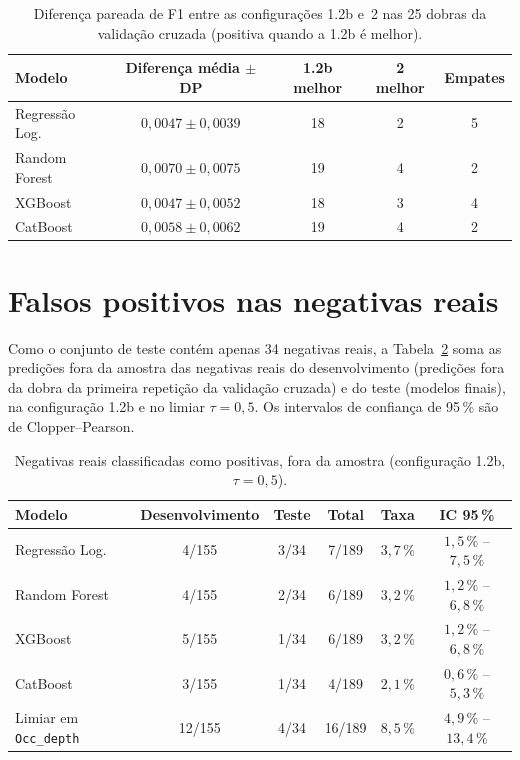 \begin{table}[htbp]
\centering
\caption{Diferença pareada de F1 entre as configurações 1.2b e~2 nas 25 dobras da validação cruzada (positiva quando a 1.2b é melhor).}
\label{tab:diferenca_pareada}
\footnotesize
\begin{tabular}{lcccc}
\hline
\textbf{Modelo} & \textbf{Diferença média $\pm$ DP} & \textbf{1.2b melhor} & \textbf{2 melhor} & \textbf{Empates} \\
\hline
Regressão Log. & $0{,}0047 \pm 0{,}0039$ & 18 & 2 & 5 \\
Random Forest & $0{,}0070 \pm 0{,}0075$ & 19 & 4 & 2 \\
XGBoost & $0{,}0047 \pm 0{,}0052$ & 18 & 3 & 4 \\
CatBoost & $0{,}0058 \pm 0{,}0062$ & 19 & 4 & 2 \\
\hline
\end{tabular}
\end{table}

\section{Falsos positivos nas negativas reais}
\label{sec:fp_reais_agregado}

Como o conjunto de teste contém apenas 34 negativas reais, a Tabela~\ref{tab:fp_reais_agregado} soma as predições fora da amostra das negativas reais do desenvolvimento (predições fora da dobra da primeira repetição da validação cruzada) e do teste (modelos finais), na configuração 1.2b e no limiar $\tau = 0{,}5$. Os intervalos de confiança de 95\,\% são de Clopper--Pearson.

\begin{table}[htbp]
\centering
\caption{Negativas reais classificadas como positivas, fora da amostra (configuração 1.2b, $\tau = 0{,}5$).}
\label{tab:fp_reais_agregado}
\footnotesize
\begin{tabular}{lccccc}
\hline
\textbf{Modelo} & \textbf{Desenvolvimento} & \textbf{Teste} & \textbf{Total} & \textbf{Taxa} & \textbf{IC 95\,\%} \\
\hline
Regressão Log. & 4/155 & 3/34 & 7/189 & $3{,}7\,\%$ & $1{,}5\,\%$ -- $7{,}5\,\%$ \\
Random Forest & 4/155 & 2/34 & 6/189 & $3{,}2\,\%$ & $1{,}2\,\%$ -- $6{,}8\,\%$ \\
XGBoost & 5/155 & 1/34 & 6/189 & $3{,}2\,\%$ & $1{,}2\,\%$ -- $6{,}8\,\%$ \\
CatBoost & 3/155 & 1/34 & 4/189 & $2{,}1\,\%$ & $0{,}6\,\%$ -- $5{,}3\,\%$ \\
Limiar em \texttt{Occ\_depth} & 12/155 & 4/34 & 16/189 & $8{,}5\,\%$ & $4{,}9\,\%$ -- $13{,}4\,\%$ \\
\hline
\end{tabular}
\end{table}

